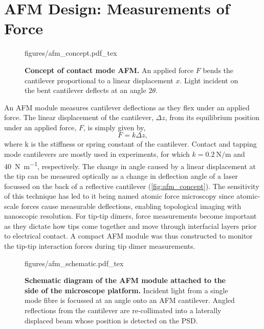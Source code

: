 \documentclass{article}
\begin{document}
\section{AFM Design: Measurements of Force}

\begin{wrapfigure}{O}{0.38\textwidth}
\centering
\vspace{-10pt}
\fontsize{10pt}{1em}\selectfont
\def\svgwidth{\textwidth}
{figures/afm_concept.pdf_tex}
\caption[Concept of contact mode AFM]{\textbf{Concept of contact mode AFM.} An applied force $F$ bends the cantilever proportional to a linear displacement $x$. Light incident on the bent cantilever deflects at an angle $2\theta$.}
\label{fig:afm_concept}
\vspace{-5pt}
\end{wrapfigure}

An AFM module measures cantilever deflections as they flex under an applied force. The linear displacement of the cantilever, $\Delta z$, from its equilibrium position under an applied force, $F$, is simply given by,
\begin{equation}
	F=k\Delta z, \label{eq:hookes_law}
\end{equation}
where \gls{k} is the stiffness or spring constant of the cantilever. Contact and tapping mode cantilevers are mostly used in experiments, for which $k=\SI{0.2}{\newton\per\metre}$ and \SI{40}{\newton\per\metre}, respectively. The change in angle caused by a linear displacement at the tip can be measured optically as a change in deflection angle of a laser focussed on the back of a reflective cantilever (\autoref{fig:afm_concept}). The sensitivity of this technique has led to it being named atomic force microscopy since atomic-scale forces cause measurable deflections, enabling topological imaging with nanoscopic resolution. For tip-tip dimers, force measurements become important as they dictate how tips come together and move through interfacial layers prior to electrical contact. A compact AFM module was thus constructed to monitor the tip-tip interaction forces during tip dimer measurements.

\begin{figure}[bt]
\centering
{\fontsize{9.5pt}{1em}\selectfont \def\svgwidth{0.8\textwidth} {figures/afm_schematic.pdf_tex}}
\caption[Schematic diagram of the AFM module.]{\textbf{Schematic diagram of the AFM module attached to the side of the microscope platform.} Incident light from a single mode fibre is focussed at an angle onto an AFM cantilever. Angled reflections from the cantilever are re-collimated into a laterally displaced beam whose position is detected on the PSD.}
\label{fig:afm_design}
\end{figure}
\end{document}
